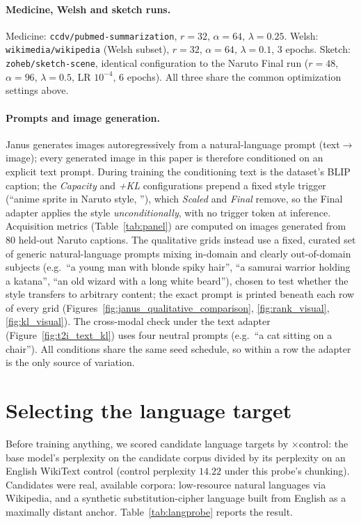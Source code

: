 \documentclass{article}
\begin{document}
\paragraph{Medicine, Welsh and sketch runs.}
Medicine: \texttt{ccdv/pubmed-summarization}, $r{=}32$, $\alpha{=}64$,
$\lambda{=}0.25$. Welsh: \texttt{wikimedia/wikipedia} (Welsh subset), $r{=}32$,
$\alpha{=}64$, $\lambda{=}0.1$, $3$ epochs. Sketch: \texttt{zoheb/sketch-scene},
identical configuration to the Naruto Final run ($r{=}48$, $\alpha{=}96$,
$\lambda{=}0.5$, LR $10^{-4}$, $6$ epochs). All three share the common
optimization settings above.

\paragraph{Prompts and image generation.}
Janus generates images autoregressively from a natural-language prompt
(text$\to$image); every generated image in this paper is therefore conditioned on
an explicit text prompt. During training the conditioning text is the dataset's
BLIP caption; the \textit{Capacity} and \textit{+KL} configurations prepend a
fixed style trigger (``anime sprite in Naruto style, ''), which \textit{Scaled}
and \textit{Final} remove, so the Final adapter applies the style
\emph{unconditionally}, with no trigger token at inference. Acquisition metrics
(Table~\ref{tab:panel}) are computed on images generated from $80$ held-out Naruto
captions. The qualitative grids instead use a fixed, curated set of generic
natural-language prompts mixing in-domain and clearly out-of-domain subjects
(e.g.\ ``a young man with blonde spiky hair'', ``a samurai warrior holding a
katana'', ``an old wizard with a long white beard''), chosen to test whether the
style transfers to arbitrary content; the exact prompt is printed beneath each row
of every grid (Figures~\ref{fig:janus_qualitative_comparison},
\ref{fig:rank_visual}, \ref{fig:kl_visual}). The cross-modal check under the text
adapter (Figure~\ref{fig:t2i_text_kl}) uses four neutral prompts (e.g.\ ``a cat
sitting on a chair''). All conditions share the same seed schedule, so within a
row the adapter is the only source of variation.


\section{Selecting the language target}
\label{app:langprobe}
Before training anything, we scored candidate language targets by
$\times$control: the base model's perplexity on the candidate corpus divided by
its perplexity on an English WikiText control (control perplexity $14.22$ under
this probe's chunking). Candidates were real, available corpora: low-resource
natural languages via Wikipedia, and a synthetic substitution-cipher language
built from English as a maximally distant anchor. Table~\ref{tab:langprobe}
reports the result.
\end{document}
